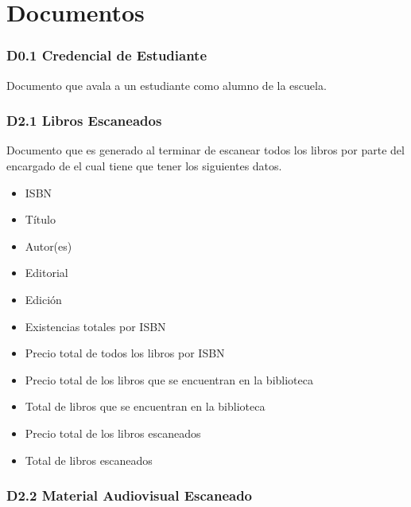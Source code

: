 \chapter{Documentos}
\label{appendix:Documentos}


\subsection{D0.1 Credencial de Estudiante }

  Documento que avala a un estudiante como alumno de la escuela.
  





\subsection{D2.1 Libros Escaneados}

  Documento que es generado al terminar de escanear todos los libros por parte del encargado de   el cual tiene que tener los siguientes datos.
  
  \begin{itemize}
  \item ISBN 
  \item Título
  \item Autor(es)
  \item Editorial
  \item Edición
  \item Existencias totales por ISBN
  \item Precio total de todos los libros por ISBN
  \item Precio total de los libros que se encuentran en la biblioteca
  \item Total de libros que se encuentran en la biblioteca
  \item Precio total de los libros  escaneados
  \item Total de libros escaneados
  \end{itemize}
  
\subsection{D2.2 Material Audiovisual Escaneado}

